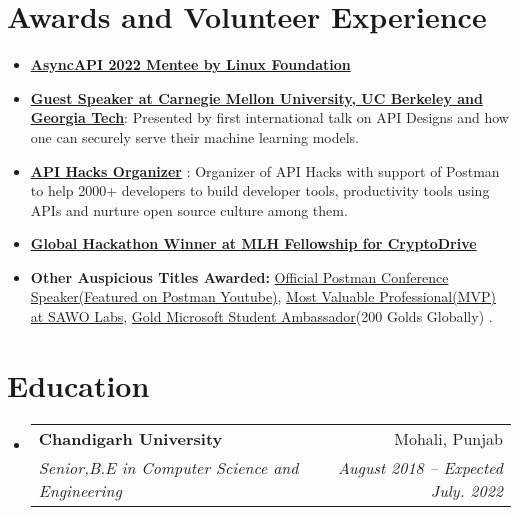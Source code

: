 \documentclass[letterpaper,11pt]{article}
\makeatletter
\newcommand{\resumeItem}[1]{
  \item\small{
    {#1 \vspace{-2pt}}
  }
}
\newcommand{\resumeSubheading}[4]{
  \vspace{-2pt}\item
    \begin{tabular*}{0.97\textwidth}[t]{l@{\extracolsep{\fill}}r}
      \textbf{#1} & #2 \\
      \textit{\small#3} & \textit{\small #4} \\
    \end{tabular*}\vspace{-7pt}
}
\newcommand{\resumeSubHeadingListStart}{\begin{itemize}[leftmargin=0.15in, label={}]}
\newcommand{\resumeSubHeadingListEnd}{\end{itemize}}
\newcommand{\resumeItemListStart}{\begin{itemize}}
\newcommand{\resumeItemListEnd}{\end{itemize}\vspace{-5pt}}
\makeatother
\begin{document}
\section{Awards and Volunteer Experience }
 \begin{itemize}[leftmargin=0.15in, label={}]
    \small{\item{
        \resumeItemListStart
                \resumeItem{\textbf{\href{https://github.com/asyncapi/community/discussions/376\#discussioncomment-2890658}{AsyncAPI 2022 Mentee by Linux Foundation}}}
                \resumeItem{\textbf{\href{https://dsailtconference.org/schedule/}{Guest Speaker at Carnegie Mellon University, UC Berkeley and Georgia Tech}}: Presented by first international talk on API Designs and how one can securely serve their machine learning models.}
                \resumeItem{\textbf{\href{https://apihacks.co}{API Hacks Organizer} }: Organizer of API Hacks with support of Postman to help 2000+ developers to build developer tools, productivity tools using APIs and nurture open source culture among them.}
                \resumeItem{\textbf{\href{https://devpost.com/software/cryptodrive}{Global Hackathon Winner at MLH Fellowship for CryptoDrive}}}
                \resumeItem{\textbf{Other Auspicious Titles Awarded:} \href{https://www.youtube.com/watch?v=-P_IGKuYmeY}{Official Postman Conference Speaker(Featured on Postman Youtube)},  \href{https://twitter.com/SawoLabs/status/1418869910332055552}{Most Valuable Professional(MVP) at SAWO Labs}, \href{https://studentambassadors.microsoft.com/en-US/profile/49532}{Gold Microsoft Student Ambassador}(200 Golds Globally) .}
      \resumeItemListEnd
    }}
 \end{itemize}
 
\section{Education}
  \resumeSubHeadingListStart
    \resumeSubheading
      {Chandigarh University}{Mohali, Punjab}
      {Senior,B.E in Computer Science and Engineering}{August 2018 -- Expected July. 2022}
  \resumeSubHeadingListEnd
\end{document}
